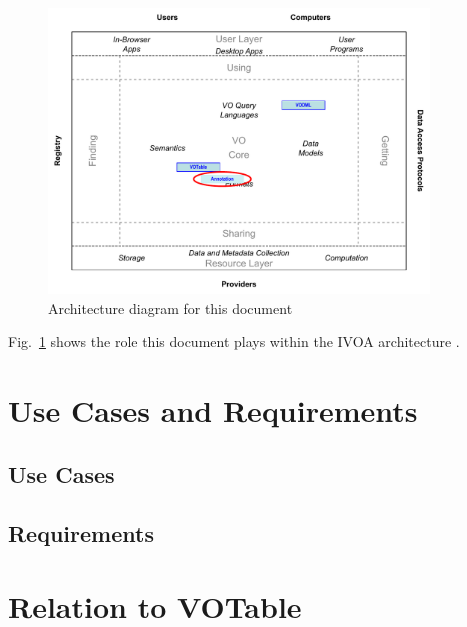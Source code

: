 \documentclass[11pt,a4paper]{ivoa}
\begin{document}
\begin{figure}[h]
\centering


\includegraphics[width=0.9\textwidth]{role_diagram.pdf}
\caption{Architecture diagram for this document}
\label{fig:archdiag}
\end{figure}

Fig.~\ref{fig:archdiag} shows the role this document plays within
the IVOA architecture \citep{2010ivoa.rept.1123A}.


\pagebreak
\section{Use Cases and Requirements}

\subsection{Use Cases}


\subsection{Requirements}


\lstset{language=XML}

\pagebreak
\section{Relation to VOTable}
\end{document}
